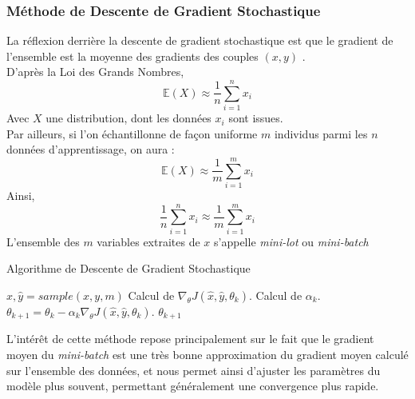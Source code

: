 \documentclass[10pt,a4paper]{report}
\begin{document}
			\subsubsection{Méthode de Descente de Gradient Stochastique}
			La réflexion derrière la descente de gradient stochastique est que le gradient de l'ensemble est la moyenne des gradients des couples $(x,y)$ .\\
			D'après la Loi des Grands Nombres, $$\mathbb{E}(X) \approx \frac{1}{n} \sum_{i=1}^{n}{x_i}$$
			Avec $X$ une distribution, dont les données $x_i$ sont issues.\\
			Par ailleurs, si l'on échantillonne de façon uniforme $m$ individus parmi les $n$ données d'apprentissage, on aura :
			$$\mathbb{E}(X) \approx \frac{1}{m} \sum_{i=1}^{m}{x_i}$$
			Ainsi,
			$$\frac{1}{n} \sum_{i=1}^{n}{x_i} \approx \frac{1}{m} \sum_{i=1}^{m}{x_i}$$
			L'ensemble des $m$ variables extraites de $x$ s'appelle \emph{mini-lot} ou \emph{mini-batch}\\
			\begin{algorithm}[H]
				\caption{Algorithme de Descente de Gradient Stochastique}
				\begin{algorithmic}
				    \REPEAT
				    	\STATE $\hat{x},\hat{y} = sample(x,y,m)$
				    	\STATE Calcul de $\nabla_\theta J(\hat{x},\hat{y},\theta_k)$.
				    	\STATE Calcul de $\alpha_k$.
				    	\STATE $\theta_{k+1} = \theta_k - \alpha_k \nabla_\theta J(\hat{x},\hat{y},\theta_k)$.
				    \RETURN $\theta_{k+1}$
				\end{algorithmic}
			\end{algorithm}
			L'intérêt de cette méthode repose principalement sur le fait que le gradient moyen du \emph{mini-batch} est une très bonne approximation du gradient moyen calculé sur l'ensemble des données, et nous permet ainsi d'ajuster les paramètres du modèle plus souvent, permettant généralement une convergence plus rapide.
\end{document}
